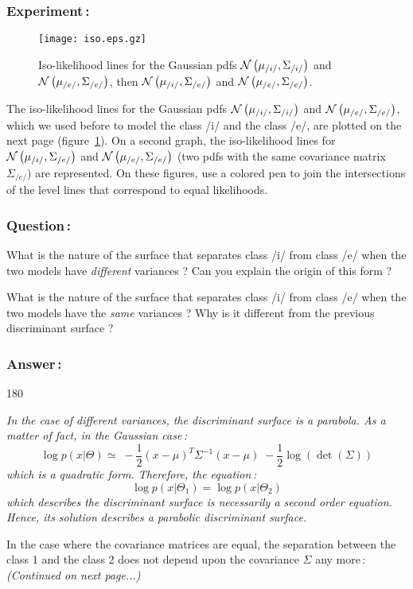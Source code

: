 \documentclass[twoside,a4paper,titlepage]{article}
\newcommand{\expl}[1]{%
\begin{turn}{180}%
\parbox{\textwidth}{\em #1}%
\end{turn}%
}
\newcommand{\tab}{\hspace{1em}}
\begin{document}
\subsubsection*{Experiment\,:}
\begin{figure}
\centerline{\texttt{[image: iso.eps.gz]}}
\caption{\label{iso}Iso-likelihood lines for the Gaussian pdfs ${\cal
N}\left(\mu_{/i/},\Sigma_{/i/}\right)$ and ${\cal N}\left(\mu_{/e/},\Sigma_{/e/}\right)$,
then ${\cal N}\left(\mu_{/i/},\Sigma_{/e/}\right)$ and ${\cal
N}\left(\mu_{/e/},\Sigma_{/e/}\right)$.}
\end{figure}
The iso-likelihood lines for the Gaussian pdfs ${\cal
N}\left(\mu_{/i/},\Sigma_{/i/}\right)$ and ${\cal N}\left(\mu_{/e/},\Sigma_{/e/}\right)$,
which we used before to model the class /i/ and the class /e/, are plotted
on the next page (figure~\ref{iso}). On a second graph, the iso-likelihood
lines for ${\cal N}\left(\mu_{/i/},\Sigma_{/e/}\right)$ and ${\cal
N}\left(\mu_{/e/},\Sigma_{/e/}\right)$ (two pdfs with the same covariance matrix
$\Sigma_{/e/}$) are represented. On these figures, use a colored pen to join
the intersections of the level lines that correspond to equal likelihoods.

\subsubsection*{Question\,:}
What is the nature of the surface that separates class /i/ from class /e/
when the two models have {\em different} variances ? Can you explain the
origin of this form ?

What is the nature of the surface that separates class /i/ from class /e/
when the two models have the {\em same} variances ? Why is it different
from the previous discriminant surface ?

\subsubsection*{Answer\,:}
\expl{
In the case of different variances, the discriminant surface is a
parabola. As a matter of fact, in the Gaussian case\,:
\[
\log p(x|\Theta)
\simeq
\; - \frac{1}{2} (x-\mu)^T \Sigma^{-1} (x-\mu) \nonumber
\; - \frac{1}{2} \log \left( \det\left(\Sigma\right) \right)
\]
which is a quadratic form. Therefore, the equation\,:
\[
\log p(x|\Theta_1) = \log p(x|\Theta_2)
\]
which describes the discriminant surface is necessarily a second order
equation. Hence, its solution describes a parabolic discriminant surface.

\tab In the case where the covariance matrices are equal, the separation
between the class 1 and the class 2 does not depend upon the covariance
$\Sigma$ any more\,:
\hfill {\em (Continued on next page...)}
}
\end{document}
